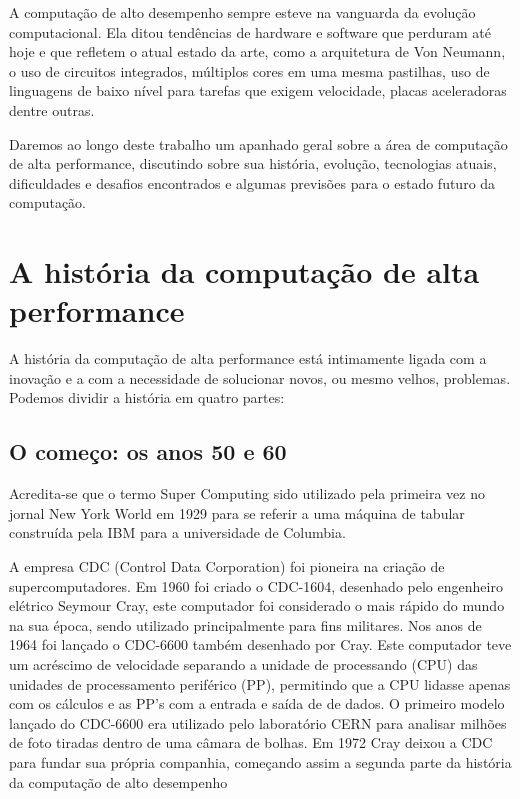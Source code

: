 \documentclass[a4paper]{article}
\begin{document}
A computação de alto desempenho sempre esteve na vanguarda da evolução computacional. Ela ditou tendências de hardware e software que perduram até hoje e que refletem o atual estado da arte, como a arquitetura de Von Neumann, o uso de circuitos integrados, múltiplos cores em uma mesma pastilhas, uso de linguagens de baixo nível para tarefas que exigem velocidade, placas aceleradoras dentre outras.

Daremos ao longo deste trabalho um apanhado geral sobre a área de computação de alta performance, discutindo sobre sua história, evolução, tecnologias atuais, dificuldades e desafios encontrados e algumas previsões para o estado futuro da computação.

\section{A história da computação de alta performance}

A história da computação de alta performance está intimamente ligada com a inovação e a com a necessidade de solucionar novos, ou mesmo velhos, problemas. Podemos dividir a história em quatro partes:

\subsection{O começo: os anos 50 e 60}

Acredita-se que o termo Super Computing sido utilizado pela primeira vez no jornal New York World em 1929 para se referir a uma máquina de tabular construída pela IBM para a universidade de Columbia.

A empresa CDC (Control Data Corporation) foi pioneira na criação de supercomputadores. Em 1960 foi criado o CDC-1604, desenhado pelo engenheiro elétrico Seymour Cray, este computador foi considerado o mais rápido do mundo na sua época, sendo utilizado principalmente para fins militares. Nos anos de 1964 foi lançado o CDC-6600 também desenhado por Cray. Este computador teve um acréscimo de velocidade separando a unidade de processando (CPU) das unidades de processamento periférico (PP), permitindo que a CPU lidasse apenas com os cálculos e as PP's com a entrada e saída de de dados. O primeiro modelo lançado do CDC-6600  era utilizado pelo laboratório CERN para analisar milhões de foto tiradas dentro de uma câmara de bolhas.
Em 1972 Cray deixou a CDC para fundar sua própria companhia, começando assim a segunda parte da história da computação de alto desempenho
\end{document}
